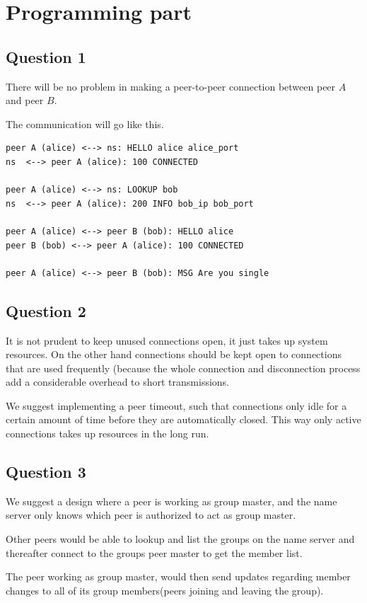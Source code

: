 \section{Programming part}
\subsection{Question 1}
There will be no problem in making a peer-to-peer connection between peer $A$
and peer $B$.

The communication will go like this.
\begin{lstlisting}
peer A (alice) <--> ns: HELLO alice alice_port
ns  <--> peer A (alice): 100 CONNECTED

peer A (alice) <--> ns: LOOKUP bob
ns  <--> peer A (alice): 200 INFO bob_ip bob_port

peer A (alice) <--> peer B (bob): HELLO alice
peer B (bob) <--> peer A (alice): 100 CONNECTED

peer A (alice) <--> peer B (bob): MSG Are you single
\end{lstlisting}

\subsection{Question 2}
It is not prudent to keep unused connections open, it just takes up system
resources. On the other hand connections should be kept open to connections
that are used frequently (because the whole connection and disconnection
process add a considerable overhead to short transmissions.

We suggest implementing a peer timeout, such that connections only idle for a
certain amount of time before they are automatically closed. This way only
active connections takes up resources in the long run.

\subsection{Question 3}
We suggest a design where a peer is working as group master, and the name
server only knows which peer is authorized to act as group master.

Other peers would be able to lookup and list the groups on the name server and
thereafter connect to the groups peer master to get the member list.

The peer working as group master, would then send updates regarding
member changes to all of its group members(peers joining and leaving the group).

